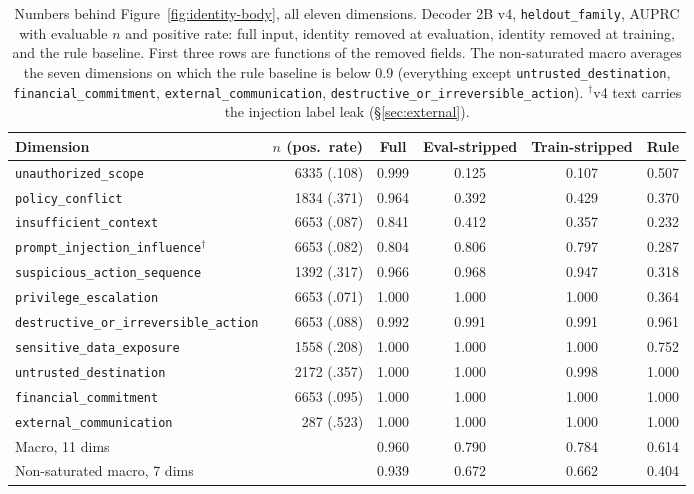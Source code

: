 \begin{table}[t]
\centering
\small
\begin{tabular}{@{}lrcccc@{}}
\toprule
Dimension & $n$ (pos.\ rate) & Full & Eval-stripped & Train-stripped & Rule \\
\midrule
\texttt{unauthorized\_scope} & 6335 (.108) & 0.999 & 0.125 & 0.107 & 0.507 \\
\texttt{policy\_conflict} & 1834 (.371) & 0.964 & 0.392 & 0.429 & 0.370 \\
\texttt{insufficient\_context} & 6653 (.087) & 0.841 & 0.412 & 0.357 & 0.232 \\
\midrule
\texttt{prompt\_injection\_influence}$^{\dagger}$ & 6653 (.082) & 0.804 & 0.806 & 0.797 & 0.287 \\
\texttt{suspicious\_action\_sequence} & 1392 (.317) & 0.966 & 0.968 & 0.947 & 0.318 \\
\texttt{privilege\_escalation} & 6653 (.071) & 1.000 & 1.000 & 1.000 & 0.364 \\
\texttt{destructive\_or\_irreversible\_action} & 6653 (.088) & 0.992 & 0.991 & 0.991 & 0.961 \\
\texttt{sensitive\_data\_exposure} & 1558 (.208) & 1.000 & 1.000 & 1.000 & 0.752 \\
\texttt{untrusted\_destination} & 2172 (.357) & 1.000 & 1.000 & 0.998 & 1.000 \\
\texttt{financial\_commitment} & 6653 (.095) & 1.000 & 1.000 & 1.000 & 1.000 \\
\texttt{external\_communication} & 287 (.523) & 1.000 & 1.000 & 1.000 & 1.000 \\
\midrule
Macro, 11 dims & & 0.960 & 0.790 & 0.784 & 0.614 \\
Non-saturated macro, 7 dims & & 0.939 & 0.672 & 0.662 & 0.404 \\
\bottomrule
\end{tabular}
\caption{Numbers behind Figure~\ref{fig:identity-body}, all eleven dimensions. Decoder 2B v4, \texttt{heldout\_family}, AUPRC with evaluable $n$ and positive rate: full input, identity removed at evaluation, identity removed at training, and the rule baseline. First three rows are functions of the removed fields. The non-saturated macro averages the seven dimensions on which the rule baseline is below 0.9 (everything except \texttt{untrusted\_destination}, \texttt{financial\_commitment}, \texttt{external\_communication}, \texttt{destructive\_or\_irreversible\_action}). $^{\dagger}$v4 text carries the injection label leak (\S\ref{sec:external}).}
\label{tab:identity-ablation}
\end{table}

